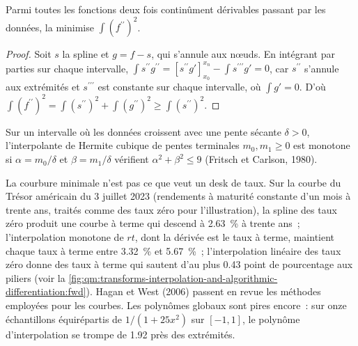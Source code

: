 \begin{proposition}\label{prop:qm:transforms-interpolation-and-algorithmic-differentiation:minimal}
Parmi toutes les fonctions deux fois continûment dérivables passant par les données, la  minimise $\int(f^{\prime\prime})^2$.
\end{proposition}

\begin{proof}
Soit $s$ la spline et $g = f - s$, qui s'annule aux nœuds. En intégrant par parties sur chaque intervalle, $\int s^{\prime\prime}g^{\prime\prime} = [s^{\prime\prime}g']_{x_0}^{x_n} - \int s^{\prime\prime\prime}g' = 0$, car $s^{\prime\prime}$ s'annule aux extrémités et $s^{\prime\prime\prime}$ est
constante sur chaque intervalle, où $\int g' = 0$. D'où $\int(f^{\prime\prime})^2 = \int(s^{\prime\prime})^2 + \int(g^{\prime\prime})^2 \ge \int(s^{\prime\prime})^2$.
\end{proof}

\begin{proposition}\label{prop:qm:transforms-interpolation-and-algorithmic-differentiation:fc}
Sur un intervalle où les données croissent avec une pente sécante $\delta > 0$, l'interpolante de Hermite cubique de pentes terminales $m_0, m_1 \ge 0$ est monotone si $\alpha = m_0/\delta$ et $\beta = m_1/\delta$ vérifient
$\alpha^2 + \beta^2 \le 9$ (Fritsch et Carlson, 1980).
\end{proposition}

La courbure minimale n'est pas ce que veut un desk de taux. Sur la courbe du Trésor américain du 3 juillet 2023 (rendements à maturité constante d'un mois à trente ans, traités comme des taux zéro pour l'illustration), la
spline des taux zéro produit une courbe à terme qui descend à 2.63~\% à trente ans~; l'interpolation monotone de $rt$, dont la dérivée est le taux à terme, maintient chaque taux à terme entre 3.32~\% et 5.67~\%~;
l'interpolation linéaire des taux zéro donne des taux à terme qui sautent d'au plus 0.43 point de pourcentage aux piliers (voir la \cref{fig:qm:transforms-interpolation-and-algorithmic-differentiation:fwd}). Hagan et West (2006)
passent en revue les méthodes employées pour les courbes. Les polynômes globaux sont pires encore~: sur onze échantillons équirépartis de $1/(1 + 25x^2)$ sur $[-1, 1]$, le polynôme d'interpolation se trompe de 1.92 près des extrémités.

